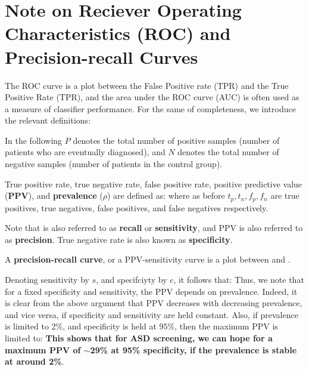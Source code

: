 \documentclass[onecolumn,,10pt]{IEEEtran}
\begin{document}
\section{Note on Reciever Operating Characteristics (ROC) and Precision-recall  Curves}\label{sec:ROC}

The ROC curve is a plot between the False Positive rate (TPR) and the True Positive Rate (TPR), and the area under the ROC curve (AUC) is often used as a measure of classifier performance. For the same of completeness, we introduce the relevant definitions:

In the following $P$ denotes the total number of positive samples (number of patients who are eventually diagnosed), and $N$ denotes the total number of negative  samples (number of patients in the control group).
\begin{defn}
  True positive rate, true negative rate, false positive rate,  positive predictive value (\textbf{PPV}), and \textbf{prevalence} ($\rho$) are defined as: 
  where as before $t_p,t_n,f_p,f_n$ are true positives, true negatives, false positives, and false negatives respectively. 
\end{defn}
%
Note that \TPR is also referred to as \textbf{recall} or \textbf{sensitivity}, and PPV is also referred to as \textbf{precision}. True negative rate is also known as \textbf{specificity}.

A \textbf{precision-recall curve}, or a PPV-sensitivity curve is a plot between \PPV and \TPR.

Denoting sensitivity by $s$, and specifciyty by $c$, it follows that:
%
Thus, we note that for a fixed specificity and sensitivity, the PPV depends on prevalence. Indeed, it is clear from the above argument that PPV decreases with decreasing prevalence, and vice versa, if specificity and sensitivity are held constant. Also, if prevalence is limited to 2\%, and specificity is held at $95\%$, then the maximum PPV is limited to:
%
\textbf{This shows that for ASD screening, we can hope for a maximum PPV of $\sim$29\% at 95\% specificity, if the prevalence is stable at around 2\%}.
\end{document}
